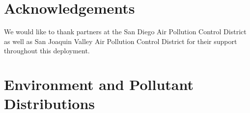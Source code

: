 \documentclass[journal abbreviation, manuscript]{copernicus}
\newcommand{\textus}[1]{$_{\text{#1}}$}
\begin{document}

\section{Acknowledgements}

We would like to thank partners at the San Diego Air Pollution Control District as well as San Joaquin Valley Air Pollution Control District for their support throughout this deployment. 

\clearpage
\appendix
\setcounter{table}{0}

\section{Environment and Pollutant Distributions}\label{Distributions}
\end{document}
